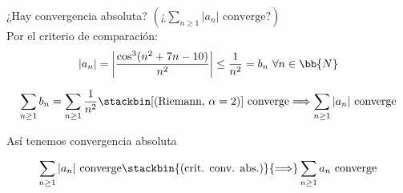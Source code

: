 \documentclass[12pt]{article}
\begin{document}
\begin{ejercicio}[3 puntos]
\begin{enumerate}
            ¿Hay convergencia absoluta? $\left( \text{¿} \sum\limits_{n \geq 1}|a_n| \text{ converge?}\right)$\\

            Por el criterio de comparación:
            \[
                |a_n| = \left| \dfrac{\cos^3(n^2 + 7n - 10)}{n^2} \right| \leq \dfrac{1}{n^2}=b_n \,\, \forall n \in \bb{N}
            \]

            \[
                \sum\limits_{n\geq 1} b_n = \sum\limits_{n\geq 1}\dfrac{1}{n^2} \stackbin[\text{(Riemann, }\alpha=2)] {}{ \text{ converge}} \Longrightarrow \sum\limits_{n \geq 1} |a_n| \text{ converge}
            \]

            Así tenemos convergencia absoluta

            \[
                \sum\limits_{n \geq 1} |a_n| \text{ converge} \stackbin{\text{(crit. conv. abs.)}}{\Longrightarrow} \sum\limits_{n \geq 1} a_n \text{ converge}
            \]
            
        \end{enumerate}
    \end{ejercicio}



     
\end{document}
